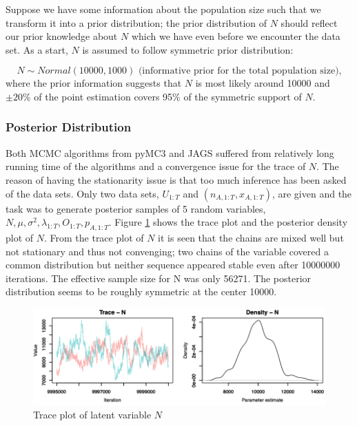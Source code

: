 \documentclass[12pt]{article}
\begin{document}
{Suppose we have some information about the population size such that we transform it into a prior distribution; the prior distribution of $N$ should reflect our prior knowledge about $N$ which we have even before we encounter the data set. As a start,  $N$ is assumed to follow symmetric prior distribution: 

\begin{equation}
\label{in_prior_N}
N \sim Normal(10000,1000)
\text{ (informative prior for the total population size),}
\end{equation} 
where the prior information suggests that $N$ is most likely around 10000 and $\pm 20\%$ of the point estimation covers  95\% of the symmetric support of $N$.
\subsubsection{Posterior Distribution}
Both MCMC algorithms from pyMC3 and JAGS suffered from relatively long running time of the algorithms and a convergence issue for the trace of $N$. The reason of having the stationarity issue is that too much inference has been asked of the data sets. Only two data sets, $U_{1:T}$ and $(n_{A,1:T}, x_{A,1:T})$, are given and the task was to generate posterior samples of 5 random variables, $N, \mu, \sigma^2, \lambda_{1:T}, O_{1:T}, p_{A,1:T}$. Figure \ref{trace_N} shows the trace plot and the posterior density plot of $N$. From the trace plot of $N$ it is seen that the chains are mixed well but not stationary and thus not convenging; two chains of the variable covered a common distribution but neither sequence appeared stable even after 10000000 iterations. The effective sample size for N was only 56271. The posterior distribution seems to be roughly symmetric at the center 10000. 
\begin{figure}[htb]
	\centering
	\includegraphics[width=1\linewidth]{Figures/not_mixed_N.png}
	\caption[Unobserved $N$: trace plot of latent variable $N$]{Trace plot of latent variable $N$}
	\label{trace_N}
\end{figure}

}
\end{document}
